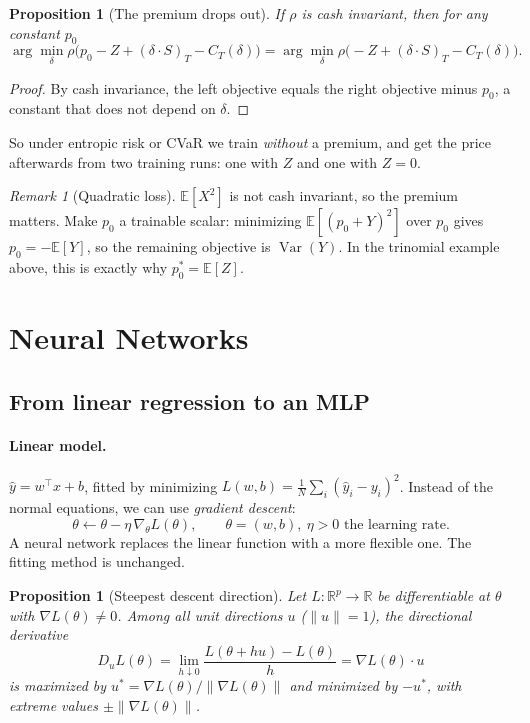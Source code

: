 \documentclass[11pt]{article}
\newtheorem{proposition}[theorem]{Proposition}
\theoremstyle{definition}
\theoremstyle{remark}
\newtheorem{remark}[theorem]{Remark}
\newcommand{\E}{\mathbb{E}}
\begin{document}
\begin{proposition}[The premium drops out]
If $\rho$ is cash invariant, then for any constant $p_0$
\[
\arg\min_\delta\rho\bigl(p_0-Z+(\delta\cdot S)_T-C_T(\delta)\bigr)=\arg\min_\delta\rho\bigl(-Z+(\delta\cdot S)_T-C_T(\delta)\bigr).
\]
\end{proposition}

\begin{proof}
By cash invariance, the left objective equals the right objective minus $p_0$, a constant that does not depend on $\delta$.
\end{proof}

So under entropic risk or CVaR we train \emph{without} a premium, and get the price afterwards from two training runs:
one with $Z$ and one with $Z=0$.

\begin{remark}[Quadratic loss]
$\E[X^2]$ is not cash invariant, so the premium matters. Make $p_0$ a trainable scalar: minimizing
$\E[(p_0+Y)^2]$ over $p_0$ gives $p_0=-\E[Y]$, so the remaining objective is $\operatorname{Var}(Y)$.
In the trinomial example above, this is exactly why $p_0^*=\E[Z]$.
\end{remark}

\section{Neural Networks}\label{sec:nn}

\subsection{From linear regression to an MLP}

\paragraph{Linear model.} $\hat y=w^\top x+b$, fitted by minimizing $L(w,b)=\frac1N\sum_i(\hat y_i-y_i)^2$.
Instead of the normal equations, we can use \emph{gradient descent}:
\[
\theta\leftarrow\theta-\eta\,\nabla_\theta L(\theta),\qquad \theta=(w,b),\ \eta>0 \text{ the learning rate.}
\]
A neural network replaces the linear function with a more flexible one. The fitting method is unchanged.

\begin{proposition}[Steepest descent direction]
Let $L:\mathbb R^p\to\mathbb R$ be differentiable at $\theta$ with $\nabla L(\theta)\neq 0$. Among all unit directions $u$ ($\|u\|=1$), the directional derivative
\[
D_uL(\theta)=\lim_{h\downarrow 0}\frac{L(\theta+hu)-L(\theta)}{h}=\nabla L(\theta)\cdot u
\]
is maximized by $u^*=\nabla L(\theta)/\|\nabla L(\theta)\|$ and minimized by $-u^*$, with extreme values $\pm\|\nabla L(\theta)\|$.
\end{proposition}
\end{document}
